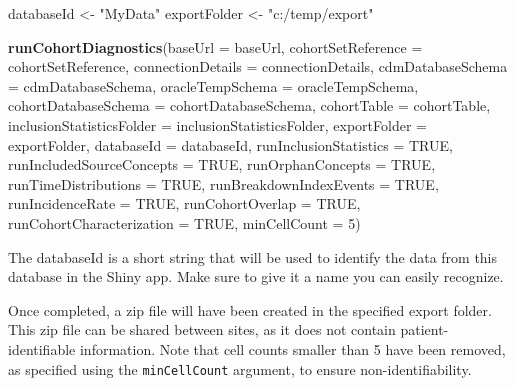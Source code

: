 \documentclass[
]{article}
\newenvironment{Shaded}{\begin{snugshade}}{\end{snugshade}}
\newcommand{\DataTypeTok}[1]{\textcolor[rgb]{0.13,0.29,0.53}{#1}}
\newcommand{\DecValTok}[1]{\textcolor[rgb]{0.00,0.00,0.81}{#1}}
\newcommand{\KeywordTok}[1]{\textcolor[rgb]{0.13,0.29,0.53}{\textbf{#1}}}
\newcommand{\NormalTok}[1]{#1}
\newcommand{\OtherTok}[1]{\textcolor[rgb]{0.56,0.35,0.01}{#1}}
\newcommand{\StringTok}[1]{\textcolor[rgb]{0.31,0.60,0.02}{#1}}
\begin{document}
\begin{Shaded}
\begin{Highlighting}[]
\NormalTok{databaseId <-}\StringTok{ "MyData"}
\NormalTok{exportFolder <-}\StringTok{ "c:/temp/export"}

\KeywordTok{runCohortDiagnostics}\NormalTok{(}\DataTypeTok{baseUrl =}\NormalTok{ baseUrl,}
                     \DataTypeTok{cohortSetReference =}\NormalTok{ cohortSetReference,}
                     \DataTypeTok{connectionDetails =}\NormalTok{ connectionDetails,}
                     \DataTypeTok{cdmDatabaseSchema =}\NormalTok{ cdmDatabaseSchema,}
                     \DataTypeTok{oracleTempSchema =}\NormalTok{ oracleTempSchema,}
                     \DataTypeTok{cohortDatabaseSchema =}\NormalTok{ cohortDatabaseSchema,}
                     \DataTypeTok{cohortTable =}\NormalTok{ cohortTable,}
                     \DataTypeTok{inclusionStatisticsFolder =}\NormalTok{ inclusionStatisticsFolder,}
                     \DataTypeTok{exportFolder =}\NormalTok{ exportFolder,}
                     \DataTypeTok{databaseId =}\NormalTok{ databaseId,}
                     \DataTypeTok{runInclusionStatistics =} \OtherTok{TRUE}\NormalTok{,}
                     \DataTypeTok{runIncludedSourceConcepts =} \OtherTok{TRUE}\NormalTok{,}
                     \DataTypeTok{runOrphanConcepts =} \OtherTok{TRUE}\NormalTok{,}
                     \DataTypeTok{runTimeDistributions =} \OtherTok{TRUE}\NormalTok{,}
                     \DataTypeTok{runBreakdownIndexEvents =} \OtherTok{TRUE}\NormalTok{,}
                     \DataTypeTok{runIncidenceRate =} \OtherTok{TRUE}\NormalTok{,}
                     \DataTypeTok{runCohortOverlap =} \OtherTok{TRUE}\NormalTok{,}
                     \DataTypeTok{runCohortCharacterization =} \OtherTok{TRUE}\NormalTok{,}
                     \DataTypeTok{minCellCount =} \DecValTok{5}\NormalTok{)}
\end{Highlighting}
\end{Shaded}

The databaseId is a short string that will be used to identify the data
from this database in the Shiny app. Make sure to give it a name you can
easily recognize.

Once completed, a zip file will have been created in the specified
export folder. This zip file can be shared between sites, as it does not
contain patient-identifiable information. Note that cell counts smaller
than 5 have been removed, as specified using the \texttt{minCellCount}
argument, to ensure non-identifiability.
\end{document}
